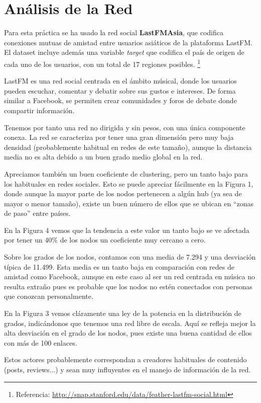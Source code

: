 \section{Análisis de la Red}

Para esta práctica se ha usado la red social \textbf{LastFMAsia}, que codifica conexiones mutuas de amistad entre usuarios asiáticos de la plataforma LastFM. El dataset incluye además una variable \textit{target} que codifica el país de origen de cada uno de los usuarios, con un total de 17 regiones posibles. \footnote{Referencia: \url{http://snap.stanford.edu/data/feather-lastfm-social.html}}

LastFM es una red social centrada en el ámbito músical, donde los usuarios pueden escuchar, comentar y debatir sobre sus gustos e intereses. De forma similar a Facebook, se permiten crear comunidades y foros de debate donde compartir información.

\vspace{\baselineskip}

Tenemos por tanto una red no dirigida y sin pesos, con una única componente conexa. La red se caracteriza por tener una gran dimensión pero muy baja densidad (probablemente habitual en redes de este tamaño), aunque la distancia media no es alta debido a un buen grado medio global en la red.

\vspace{\baselineskip}

Apreciamos también un buen coeficiente de clustering, pero un tanto bajo para los habituales en redes sociales. Esto se puede apreciar fácilmente en la Figura 1, donde aunque la mayor parte de los nodos pertenecen a algún hub (ya sea de mayor o menor tamaño), existe un buen número de ellos que se ubican en ``zonas de paso'' entre países.

En la Figura 4 vemos que la tendencia a este valor un tanto bajo se ve afectada por tener un 40\% de los nodos un coeficiente muy cercano a cero.

\vspace{\baselineskip}

Sobre los grados de los nodos, contamos con una media de 7.294 y una desviación típica de 11.499. Esta media es un tanto baja en comparación con redes de amistad como Facebook, aunque en este caso al ser un red centrada en música no resulta extraño pues es probable que los nodos no estén conectados con personas que conozcan personalmente.

\vspace{\baselineskip}

En la Figura 3 vemos cláramente una ley de la potencia en la distribución de grados, indicándonos que tenemos una red libre de escala. Aquí se refleja mejor la alta desviación en el grado de los nodos, pues existe una buena cantidad de ellos con más de 100 enlaces.

Estos actores probablemente correspondan a creadores habituales de contenido (posts, reviews...) y sean muy influyentes en el manejo de información de la red.